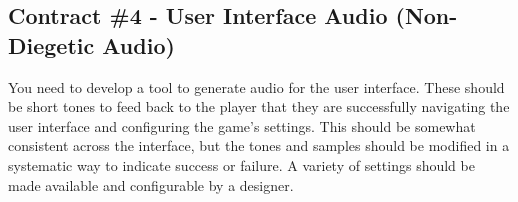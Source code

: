 \documentclass{../../fal_assignment}
\begin{document}
\subsection*{Contract \#4 - User Interface Audio (Non-Diegetic Audio)}
You need to develop a tool to generate audio for the user interface. These should be short tones to feed back to the player that they are successfully navigating the user interface and configuring the game's settings. This should be somewhat consistent across the interface, but the tones and samples should be modified in a systematic way to indicate success or failure. A variety of settings should be made available and configurable by a designer.
\end{document}
